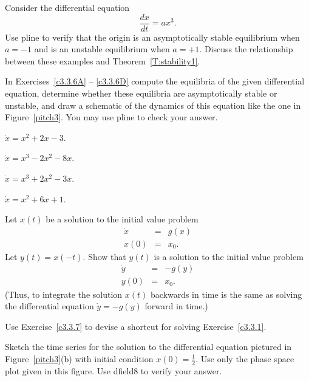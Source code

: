 \documentclass{ximera}
\begin{document}
\begin{exercise} \label{c3.3.5}
Consider the differential equation
\[
\frac{dx}{dt} = a x^3.
\]
Use {\sf pline} to verify that the origin is an asymptotically
stable equilibrium when $a = -1$ and is an unstable
equilibrium when $a = +1$. Discuss the relationship
between these examples and Theorem~\ref{T:stability1}.
\end{exercise}

\TEXER


\noindent In Exercises~\ref{c3.3.6A} -- \ref{c3.3.6D} compute the equilibria 
of the given differential equation, determine whether these equilibria are 
asymptotically stable or unstable, and draw a sche\-ma\-tic of the dynamics 
of this equation like the one in Figure~\ref{pitch3}.  You may use {\sf pline}
to check your answer.
\begin{exercise} \label{c3.3.6A}
$\dot{x} = x^2 + 2x - 3$.
\end{exercise}
\begin{exercise} \label{c3.3.6B}
$\dot{x} = x^3 - 2x^2 - 8x$.
\end{exercise}
\begin{exercise} \label{c3.3.6C}
$\dot{x} = x^3 + 2x^2 - 3x$.
\end{exercise}
\begin{exercise} \label{c3.3.6D}
$\dot{x} = x^2 + 6x + 1$.
\end{exercise}

\begin{exercise} \label{c3.3.7}
Let $x(t)$ be a solution to the initial value problem
\begin{eqnarray*}
\dot{x} & = & g(x) \\
x(0) & = & x_0.
\end{eqnarray*}
Let $y(t)=x(-t)$.  Show that $y(t)$ is a solution to the
initial value problem
\begin{eqnarray*}
\dot{y} & = & -g(y) \\
y(0) & = & x_0.
\end{eqnarray*}
(Thus, to integrate the solution $x(t)$ backwards in time is the
same as solving the differential equation $\dot{y}  =  -g(y)$
forward in time.)
\end{exercise}

\begin{exercise} \label{c3.3.9}
Use Exercise~\ref{c3.3.7} to devise a shortcut for solving
Exercise~\ref{c3.3.1}.
\end{exercise}

\begin{exercise} \label{c3.3.8}
Sketch the time series for the solution to the differential
equation pictured in Figure~\ref{pitch3}(b) with initial condition
$x(0)=\frac{1}{2}$.  Use only the phase space plot given in this
figure.  Use {\sf dfield8} to verify your answer.
\end{exercise}
\end{document}
